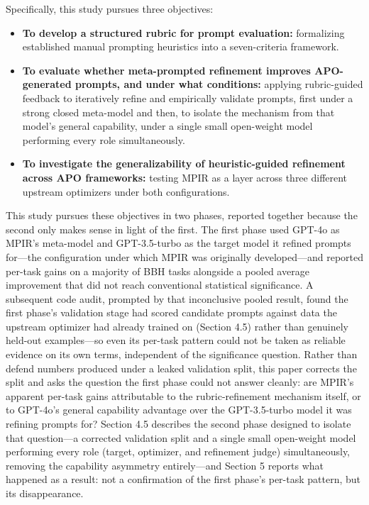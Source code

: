 \documentclass[a4paper,fleqn]{cas-sc}
\begin{document}
Specifically, this study pursues three objectives:

\begin{itemize}
\item \textbf{To develop a structured rubric for prompt evaluation:} formalizing established manual prompting heuristics into a seven-criteria framework.
\item \textbf{To evaluate whether meta-prompted refinement improves APO-generated prompts, and under what conditions:} applying rubric-guided feedback to iteratively refine and empirically validate prompts, first under a strong closed meta-model and then, to isolate the mechanism from that model's general capability, under a single small open-weight model performing every role simultaneously.
\item \textbf{To investigate the generalizability of heuristic-guided refinement across APO frameworks:} testing MPIR as a layer across three different upstream optimizers under both configurations.
\end{itemize}

This study pursues these objectives in two phases, reported together because the second only makes sense in light of the first. The first phase used GPT-4o as MPIR's meta-model and GPT-3.5-turbo as the target model it refined prompts for---the configuration under which MPIR was originally developed---and reported per-task gains on a majority of BBH tasks alongside a pooled average improvement that did not reach conventional statistical significance. A subsequent code audit, prompted by that inconclusive pooled result, found the first phase's validation stage had scored candidate prompts against data the upstream optimizer had already trained on (Section 4.5) rather than genuinely held-out examples---so even its per-task pattern could not be taken as reliable evidence on its own terms, independent of the significance question. Rather than defend numbers produced under a leaked validation split, this paper corrects the split and asks the question the first phase could not answer cleanly: are MPIR's apparent per-task gains attributable to the rubric-refinement mechanism itself, or to GPT-4o's general capability advantage over the GPT-3.5-turbo model it was refining prompts for? Section 4.5 describes the second phase designed to isolate that question---a corrected validation split and a single small open-weight model performing every role (target, optimizer, and refinement judge) simultaneously, removing the capability asymmetry entirely---and Section 5 reports what happened as a result: not a confirmation of the first phase's per-task pattern, but its disappearance.
\end{document}
